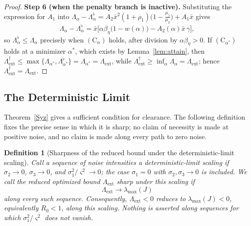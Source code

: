 \documentclass{article}
\newtheorem{definition}{Definition}[section]
\newcommand{\betaeta}{\beta_\eta}
\newcommand{\Rz}{R_0}
\newcommand{\Lext}{\Lambda_{\mathrm{ext}}}
\newcommand{\Lsharp}{\Lambda_{\mathrm{ext}}^{\dagger}}
\begin{document}
\begin{proof}
\textbf{Step 6 (when the penalty branch is inactive).} Substituting the expression for $A_1$ into $\Lambda_\alpha-\Lambda_\alpha^\flat=A_2\bar x^2(1+\rho_1)\big(1-\tfrac{\mu_1}{\mu_2}\big)+A_1\bar x$ gives
\begin{equation}\label{eq:Cgap}
\Lambda_\alpha-\Lambda_\alpha^{\flat}=\bar x\Big[\alpha\betaeta\big(1-\widehat w(\alpha)\big)-A_2(\alpha)\bar x\,\gamma\Big],
\end{equation}
so $\Lambda_\alpha^{\flat}\le\Lambda_\alpha$ precisely when $(\mathrm{C}_\alpha)$ holds, after division by $\alpha\betaeta>0$. If $(\mathrm{C}_{\alpha^\ast})$ holds at a minimizer $\alpha^\ast$, which exists by Lemma~\ref{lem:attain}, then $\Lsharp\le\max\{\Lambda_{\alpha^\ast},\Lambda_{\alpha^\ast}^\flat\}=\Lambda_{\alpha^\ast}=\Lext$, while $\Lsharp\ge\inf_\alpha\Lambda_\alpha=\Lext$; hence $\Lsharp=\Lext$.
\end{proof}

\subsection{The Deterministic Limit}

Theorem~\ref{Syz} gives a sufficient condition for clearance. The following definition fixes the precise sense in which it is sharp; no claim of necessity is made at positive noise, and no claim is made along every path to zero noise.

\begin{definition}[Sharpness of the reduced bound under the deterministic-limit scaling]
\label{def:sharp}
Call a sequence of noise intensities a deterministic-limit scaling if
$\sigma_2\to0$, $\sigma_3\to0$, and $\sigma_1^2/\varsigma^2\to0$; the case
$\sigma_1=0$ with $\sigma_2,\sigma_3\to0$ is included. We call the reduced
optimized bound $\Lext$ sharp under this scaling if
\[
\Lext\longrightarrow\lambda_{\max}(J)
\]
along every such sequence. Consequently, $\Lext<0$ reduces to
$\lambda_{\max}(J)<0$, equivalently $\Rz<1$, along this scaling. Nothing is
asserted along sequences for which $\sigma_1^2/\varsigma^2$ does not vanish.
\end{definition}
\end{document}
